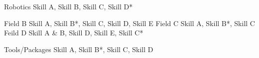 

\begin{cvskills}

  \cvskill
    {Robotics} %
    {Skill A, Skill B, Skill C, Skill D*} %

  \cvskill
    {Field B} %
    {Skill A, Skill B*, Skill C, Skill D, Skill E} %
  \cvskill
    {Field C} %
    {Skill A, Skill B*, Skill C} %
  \cvskill
    {Feild D} %
    {Skill A \& B, Skill D, Skill E, Skill C*}
    
  \cvskill
    {Tools/Packages}
    {Skill A, Skill B*, Skill C, Skill D}%

\end{cvskills}
